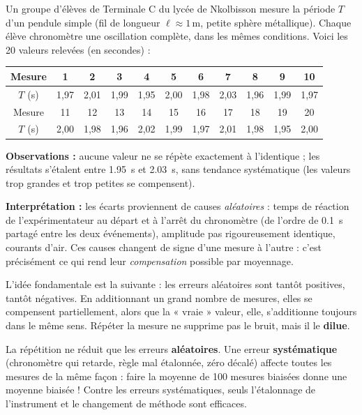 \documentclass[11pt]{article}
\newcommand{\cle}[1]{{\popxbold\color{popdark}#1}}
\begin{document}
\begin{experience}
Un groupe d'élèves de Terminale C du lycée de Nkolbisson mesure la période $T$ d'un pendule simple (fil de longueur $\ell \approx 1\,\text{m}$, petite sphère métallique). Chaque élève chronomètre une oscillation complète, dans les mêmes conditions. Voici les 20 valeurs relevées (en secondes) :

\begin{center}
\begin{tabular}{|c|cccccccccc|}
\hline
Mesure & 1 & 2 & 3 & 4 & 5 & 6 & 7 & 8 & 9 & 10 \\
\hline
$T$ (s) & 1,97 & 2,01 & 1,99 & 1,95 & 2,00 & 1,98 & 2,03 & 1,96 & 1,99 & 1,97 \\
\hline
Mesure & 11 & 12 & 13 & 14 & 15 & 16 & 17 & 18 & 19 & 20 \\
\hline
$T$ (s) & 2,00 & 1,98 & 1,96 & 2,02 & 1,99 & 1,97 & 2,01 & 1,98 & 1,95 & 2,00 \\
\hline
\end{tabular}
\end{center}

\textbf{Observations :} aucune valeur ne se répète exactement à l'identique ; les résultats s'étalent entre \SI{1,95}{s} et \SI{2,03}{s}, sans tendance systématique (les valeurs trop grandes et trop petites se compensent).

\textbf{Interprétation :} les écarts proviennent de causes \emph{aléatoires} : temps de réaction de l'expérimentateur au départ et à l'arrêt du chronomètre (de l'ordre de \SI{0,1}{s} partagé entre les deux événements), amplitude pas rigoureusement identique, courants d'air. Ces causes changent de signe d'une mesure à l'autre : c'est précisément ce qui rend leur \emph{compensation} possible par moyennage.
\end{experience}

L'idée fondamentale est la suivante : les erreurs \cle{aléatoires} sont tantôt positives, tantôt négatives. En additionnant un grand nombre de mesures, elles se compensent partiellement, alors que la « vraie » valeur, elle, s'additionne toujours dans le même sens. Répéter la mesure ne supprime pas le bruit, mais il le \textbf{dilue}.

\begin{attention}
La répétition ne réduit que les erreurs \textbf{aléatoires}. Une erreur \textbf{systématique} (chronomètre qui retarde, règle mal étalonnée, zéro décalé) affecte toutes les mesures de la même façon : faire la moyenne de 100 mesures biaisées donne une moyenne biaisée ! Contre les erreurs systématiques, seuls l'étalonnage de l'instrument et le changement de méthode sont efficaces.
\end{attention}
\end{document}
